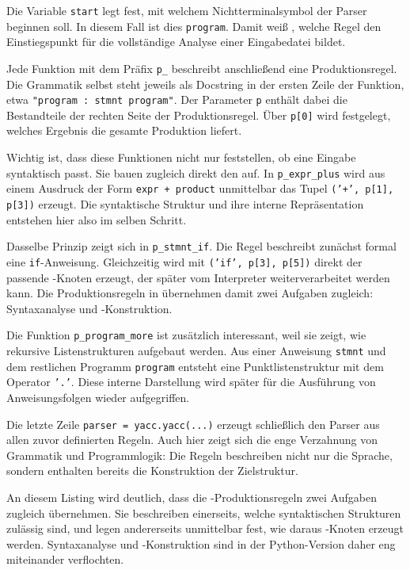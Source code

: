 Die Variable \texttt{start} legt fest, mit welchem Nichtterminalsymbol der Parser beginnen soll. In diesem Fall ist dies \texttt{program}. Damit weiß \emph{}, welche Regel den Einstiegspunkt für die vollständige Analyse einer Eingabedatei bildet.

Jede Funktion mit dem Präfix \texttt{p\_} beschreibt anschließend eine Produktionsregel. Die Grammatik selbst steht jeweils als Docstring in der ersten Zeile der Funktion, etwa \texttt{"program : stmnt program"}. Der Parameter \texttt{p} enthält dabei die Bestandteile der rechten Seite der Produktionsregel. Über \texttt{p[0]} wird festgelegt, welches Ergebnis die gesamte Produktion liefert.

Wichtig ist, dass diese Funktionen nicht nur feststellen, ob eine Eingabe syntaktisch passt. Sie bauen zugleich direkt den  auf. In \texttt{p\_expr\_plus} wird aus einem Ausdruck der Form \texttt{expr + product} unmittelbar das Tupel \texttt{('+', p[1], p[3])} erzeugt. Die syntaktische Struktur und ihre interne Repräsentation entstehen hier also im selben Schritt.

Dasselbe Prinzip zeigt sich in \texttt{p\_stmnt\_if}. Die Regel beschreibt zunächst formal eine \texttt{if}-Anweisung. Gleichzeitig wird mit \texttt{('if', p[3], p[5])} direkt der passende -Knoten erzeugt, der später vom Interpreter weiterverarbeitet werden kann. Die Produktionsregeln in \emph{} übernehmen damit zwei Aufgaben zugleich: Syntaxanalyse und -Konstruktion.

Die Funktion \texttt{p\_program\_more} ist zusätzlich interessant, weil sie zeigt, wie rekursive Listenstrukturen aufgebaut werden. Aus einer Anweisung \texttt{stmnt} und dem restlichen Programm \texttt{program} entsteht eine Punktlistenstruktur mit dem Operator \texttt{'.'}. Diese interne Darstellung wird später für die Ausführung von Anweisungsfolgen wieder aufgegriffen.

Die letzte Zeile \texttt{parser = yacc.yacc(...)} erzeugt schließlich den Parser aus allen zuvor definierten Regeln. Auch hier zeigt sich die enge Verzahnung von Grammatik und Programmlogik: Die Regeln beschreiben nicht nur die Sprache, sondern enthalten bereits die Konstruktion der Zielstruktur.

An diesem Listing wird deutlich, dass die -Produktionsregeln zwei Aufgaben zugleich übernehmen. Sie beschreiben einerseits, welche syntaktischen Strukturen zulässig sind, und legen andererseits unmittelbar fest, wie daraus -Knoten erzeugt werden. Syntaxanalyse und -Konstruktion sind in der Python-Version daher eng miteinander verflochten.

